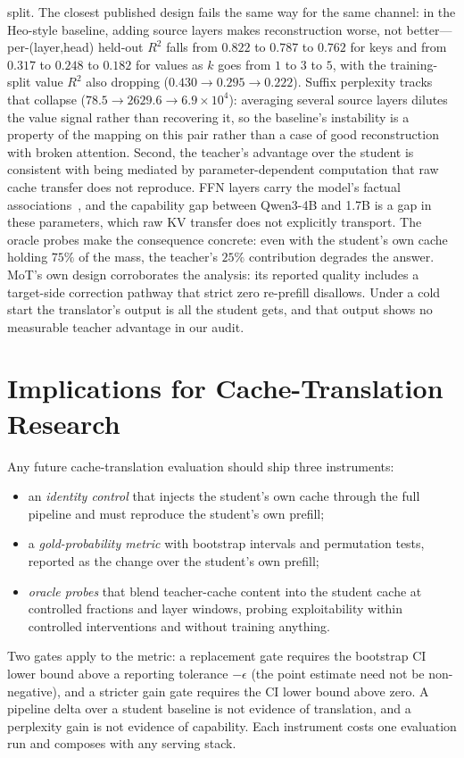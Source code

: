 \documentclass[10pt]{article}
\begin{document}
split. The closest published design fails the same way for the same channel: in the
Heo-style baseline, adding source layers makes reconstruction worse, not better---per-(layer,head)
held-out $R^2$ falls from $0.822$ to $0.787$ to $0.762$ for keys and from $0.317$ to $0.248$ to
$0.182$ for values as $k$ goes from $1$ to $3$ to $5$, with the training-split value $R^2$ also
dropping ($0.430 \to 0.295 \to 0.222$). Suffix perplexity tracks that collapse ($78.5 \to 2629.6
\to 6.9\times10^{4}$): averaging several source layers dilutes the value signal rather than
recovering it, so the baseline’s instability is a property of the mapping on this pair rather than
a case of good reconstruction with broken attention. Second, the teacher's advantage over the student is consistent with
being mediated by parameter-dependent computation that raw cache transfer does
not reproduce. FFN layers carry the model's factual
associations~\citep{ffnmemory2021}, and the capability gap between Qwen3-4B
and 1.7B is a gap in these parameters, which raw KV transfer does not explicitly transport. The
oracle probes make the consequence concrete: even with the student's own
cache holding $75\%$ of the mass, the teacher's $25\%$ contribution degrades
the answer. MoT's own design corroborates the analysis: its reported quality
includes a target-side correction pathway that strict zero re-prefill disallows. Under a cold
start the translator's output is all the student gets, and that output shows
no measurable teacher advantage in our audit.

\section{Implications for Cache-Translation Research}
\label{sec:implications}

Any future cache-translation evaluation should ship three instruments:
\begin{itemize}
\item an \emph{identity control} that injects the student's own cache through
the full pipeline and must reproduce the student's own prefill;
\item a \emph{gold-probability metric} with bootstrap intervals and
permutation tests, reported as the change over the student's own prefill;
\item \emph{oracle probes} that blend teacher-cache content into the student
cache at controlled fractions and layer windows, probing exploitability within
controlled interventions and without training anything.
\end{itemize}
Two gates apply to the metric: a replacement gate requires the bootstrap CI
lower bound above a reporting tolerance $-\epsilon$ (the point estimate
need not be non-negative), and a stricter
gain gate requires the CI lower bound above zero. A pipeline delta over a
student baseline is not evidence of translation, and a perplexity gain is not
evidence of capability. Each instrument costs one evaluation run and composes
with any serving stack.
\end{document}
